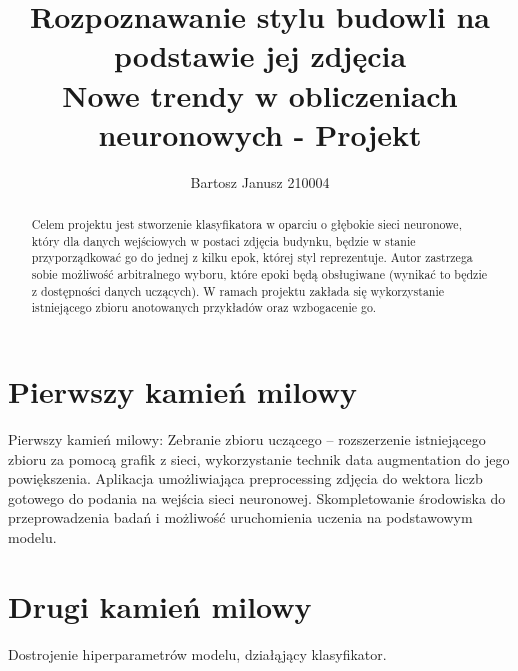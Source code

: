 \documentclass{article}
\title{Rozpoznawanie stylu budowli na podstawie jej zdjęcia
\\\normalsize Nowe trendy w obliczeniach neuronowych - Projekt }
\author{Bartosz Janusz 210004}
\begin{document}

\maketitle

\begin{abstract}
  Celem projektu jest stworzenie klasyfikatora w oparciu o głębokie sieci neuronowe, który dla danych wejściowych w postaci zdjęcia budynku, będzie w stanie przyporządkować go do jednej z kilku epok, której styl reprezentuje. Autor zastrzega sobie możliwość arbitralnego wyboru, które epoki będą obsługiwane (wynikać to będzie z dostępności danych uczących). W ramach projektu zakłada się wykorzystanie istniejącego zbioru anotowanych przykładów oraz wzbogacenie go. 
\end{abstract}

\section{Pierwszy kamień milowy}
Pierwszy kamień milowy:
Zebranie zbioru uczącego – rozszerzenie istniejącego zbioru za pomocą grafik z sieci, wykorzystanie technik data augmentation do jego powiększenia. Aplikacja umożliwiająca preprocessing zdjęcia do wektora liczb gotowego do podania na wejścia sieci neuronowej. Skompletowanie środowiska do przeprowadzenia badań i możliwość uruchomienia uczenia na podstawowym modelu.
\section{Drugi kamień milowy}
Dostrojenie hiperparametrów modelu, działąjący klasyfikator.
\end{document}
